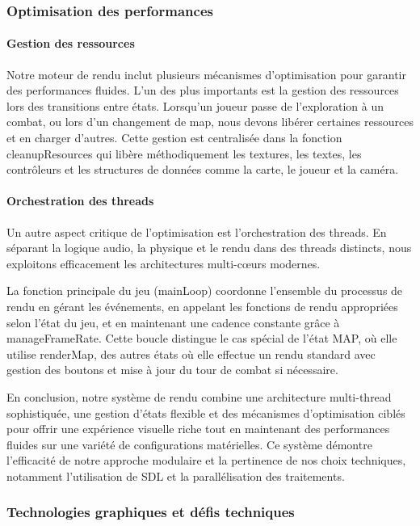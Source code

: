 \documentclass[12pt,a4paper, twoside]{article}
\begin{document}
\subsubsection{Optimisation des performances}
\paragraph{Gestion des ressources} Notre moteur de rendu inclut plusieurs mécanismes d'optimisation pour garantir des performances fluides. L'un des plus importants est la gestion des ressources lors des transitions entre états. Lorsqu'un joueur passe de l'exploration à un combat, ou lors d'un changement de map, nous devons libérer certaines ressources et en charger d'autres. Cette gestion est centralisée dans la fonction cleanupResources qui libère méthodiquement les textures, les textes, les contrôleurs et les structures de données comme la carte, le joueur et la caméra.

\paragraph{Orchestration des threads} Un autre aspect critique de l'optimisation est l'orchestration des threads. En séparant la logique audio, la physique et le rendu dans des threads distincts, nous exploitons efficacement les architectures multi-cœurs modernes.

La fonction principale du jeu (mainLoop) coordonne l'ensemble du processus de rendu en gérant les événements, en appelant les fonctions de rendu appropriées selon l'état du jeu, et en maintenant une cadence constante grâce à manageFrameRate. Cette boucle distingue le cas spécial de l'état MAP, où elle utilise renderMap, des autres états où elle effectue un rendu standard avec gestion des boutons et mise à jour du tour de combat si nécessaire.

En conclusion, notre système de rendu combine une architecture multi-thread sophistiquée, une gestion d'états flexible et des mécanismes d'optimisation ciblés pour offrir une expérience visuelle riche tout en maintenant des performances fluides sur une variété de configurations matérielles. Ce système démontre l'efficacité de notre approche modulaire et la pertinence de nos choix techniques, notamment l'utilisation de SDL et la parallélisation des traitements.

\subsubsection{Technologies graphiques et défis techniques}
\end{document}
